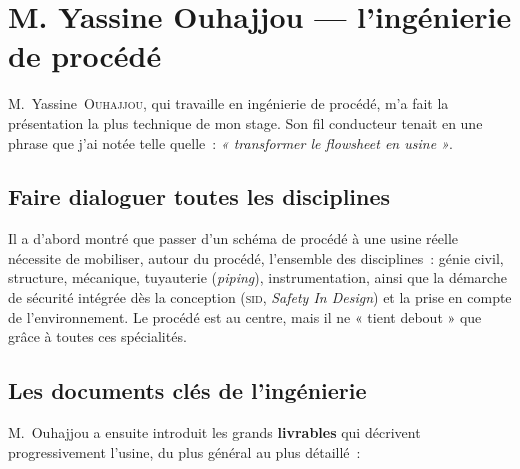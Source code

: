 \documentclass[12pt,a4paper,oneside]{report}
\newcommand{\sig}[1]{\textsc{#1}}
\begin{document}
\section{M. Yassine Ouhajjou --- l'ingénierie de procédé}

M.~Yassine~\textsc{Ouhajjou}, qui travaille en ingénierie de procédé, m'a fait la présentation la plus technique de mon stage. Son fil conducteur tenait en une phrase que j'ai notée telle quelle~: \textit{« transformer le \textit{flowsheet} en usine »}.

\subsection{Faire dialoguer toutes les disciplines}

Il a d'abord montré que passer d'un schéma de procédé à une usine réelle nécessite de mobiliser, autour du procédé, l'ensemble des disciplines~: génie civil, structure, mécanique, tuyauterie (\textit{piping}), instrumentation, ainsi que la démarche de sécurité intégrée dès la conception (\sig{sid}, \textit{Safety In Design}) et la prise en compte de l'environnement. Le procédé est au centre, mais il ne « tient debout » que grâce à toutes ces spécialités.

\subsection{Les documents clés de l'ingénierie}

M.~Ouhajjou a ensuite introduit les grands \textbf{livrables} qui décrivent progressivement l'usine, du plus général au plus détaillé~:

\begin{center}
\label{fig:documents}
\end{center}
\end{document}
